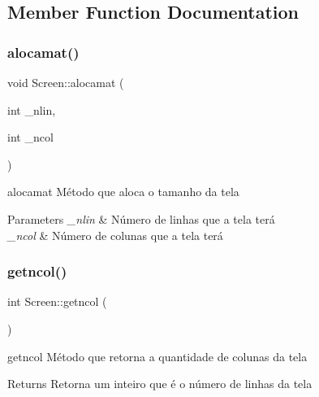 \subsection{Member Function Documentation}
\mbox{\label{class_screen_a3570e45d7dbc261cc4da471259a66d7a}} 
\subsubsection{\texorpdfstring{alocamat()}{alocamat()}}
{\footnotesize\ttfamily void Screen\+::alocamat (\begin{DoxyParamCaption}\item[{int}]{\+\_\+nlin,  }\item[{int}]{\+\_\+ncol }\end{DoxyParamCaption})}



alocamat Método que aloca o tamanho da tela 


\begin{DoxyParams}{Parameters}
{\em \+\_\+nlin} & Número de linhas que a tela terá \\
\hline
{\em \+\_\+ncol} & Número de colunas que a tela terá \\
\hline
\end{DoxyParams}
\mbox{\label{class_screen_abaae93e39587a865d4ac1f7fa1a501c2}} 
\subsubsection{\texorpdfstring{getncol()}{getncol()}}
{\footnotesize\ttfamily int Screen\+::getncol (\begin{DoxyParamCaption}{ }\end{DoxyParamCaption})}



getncol Método que retorna a quantidade de colunas da tela 

\begin{DoxyReturn}{Returns}
Retorna um inteiro que é o número de linhas da tela 
\end{DoxyReturn}
\mbox{\label{class_screen_ac247e58a4575bbafa46b9f9d24841538}} 
